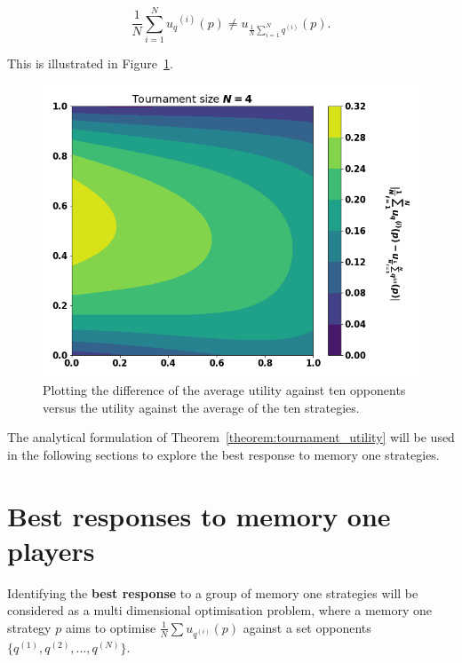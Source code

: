 \documentclass[10pt]{article}
\begin{document}
\begin{equation}\label{eq:tournament_hypothesis}
    \frac{1}{N} \sum_{i=1} ^ {N} {u_q}^{(i)} (p) \neq
      u_{\frac {1}{N} \sum\limits_{i=1} ^ N q^{(i)}}(p).
\end{equation}

This is illustrated in Figure~\ref{fig:hypothesis}.

\begin{figure}[!htbp]
    \begin{center}
            \includegraphics[width=\linewidth]{img/mean_vs_average_two.png}
    \end{center}
    \caption{Plotting the difference of the average utility against ten
    opponents versus the utility against the average of the ten strategies.}
    \label{fig:hypothesis}
\end{figure}


The analytical formulation of Theorem~\ref{theorem:tournament_utility} will be
used in the following sections to explore the best response to memory one
strategies.

\section{Best responses to memory one players}\label{section:best_response_mem_one}

Identifying the \textbf{best response} to a group of memory one strategies  will
be considered as a multi dimensional optimisation problem, where a memory one
strategy \(p\) aims to optimise
\( \frac{1}{N} \sum u_{q ^{(i)}} (p)\) against a set opponents
\(\{q^{(1)}, q^{(2)}, \dots, q^{(N)} \}\).
\end{document}
